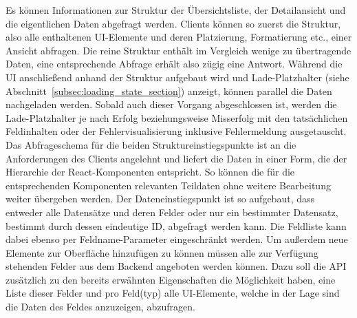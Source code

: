 Es können Informationen zur Struktur der Übersichtsliste, der Detailansicht und die eigentlichen Daten abgefragt werden. Clients können so zuerst die Struktur, also alle enthaltenen UI-Elemente und deren Platzierung, Formatierung etc., einer Ansicht abfragen. Die reine Struktur enthält im Vergleich wenige zu übertragende Daten, eine entsprechende Abfrage erhält also zügig eine Antwort. Während die UI anschließend anhand der Struktur aufgebaut wird und Lade-Platzhalter (siehe Abschnitt~\ref{subsec:loading_state_section}) anzeigt, können parallel die Daten nachgeladen werden. Sobald auch dieser Vorgang abgeschlossen ist, werden die Lade-Platzhalter je nach Erfolg beziehungsweise Misserfolg mit den tatsächlichen Feldinhalten oder der Fehlervisualisierung inklusive Fehlermeldung ausgetauscht.
Das Abfrageschema für die beiden Struktureinstiegspunkte ist an die Anforderungen des Clients angelehnt und liefert die Daten in einer Form, die der Hierarchie der React-Komponenten entspricht. So können die für die entsprechenden Komponenten relevanten Teildaten ohne weitere Bearbeitung weiter übergeben werden. Der Dateneinstiegspunkt ist so aufgebaut, dass entweder alle Datensätze und deren Felder oder nur ein bestimmter Datensatz, bestimmt durch dessen eindeutige ID, abgefragt werden kann. Die Feldliste kann dabei ebenso per Feldname-Parameter eingeschränkt werden.
Um außerdem neue Elemente zur Oberfläche hinzufügen zu können müssen alle zur Verfügung stehenden Felder aus dem Backend angeboten werden können. Dazu soll die API zusätzlich zu den bereits erwähnten Eigenschaften die Möglichkeit haben, eine Liste dieser Felder und pro Feld(typ) alle UI-Elemente, welche in der Lage sind die Daten des Feldes anzuzeigen, abzufragen.

